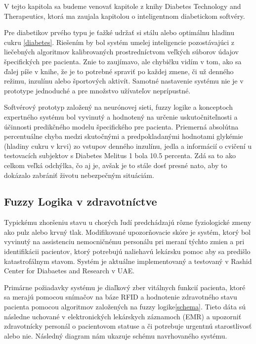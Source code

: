 V tejto kapitola sa budeme venovať kapitole z knihy Diabetes Technology and Therapeutics\cite{2000}, ktorá ma zaujala kapitolou o inteligentnom diabetickom softvéry.

Pre diabetikov prvého typu je ťažké udržať si stálu alebo optimálnu hladinu cukru \ref{diabetes}. Riešením by bol systém umelej inteligencie pozostávajúci z liečebných algoritmov kalibrovaných prostredníctvom veľkých súborov údajov špecifických pre pacienta.\cite{2000} Znie to zaujímavo, ale chybičku vidím v tom, ako sa ďalej píše v knihe, že je to potrebné spraviť po každej zmene, či už denného režimu, inzulínu alebo športových aktivít. Samotné nastavenie systému nie je v prototype jednoduché a pre množstvo užívateľov neprípustné. 

Softvérový prototyp založený na neurónovej sieti, fuzzy logike a konceptoch expertného systému bol vyvinutý a hodnotený na určenie uskutočniteľnosti a účinnosti predikčného modelu špecifického pre pacienta. Priemerná absolútna percentuálne chyba medzi skutočnými a predpokladanými hodnotami glykémie (hladiny cukru v krvi) zo vstupov denného inzulínu, jedla a informácií o cvičení u testovacích subjektov s Diabetes Melitus 1 bola 10.5 percenta.\cite{2000}
Zdá sa to ako celkom veľká odchýlka, čo aj je, avšak je to stále dosť presné nato, aby to dokázalo zabrániť životu nebezpečným situáciám. 

\subsection{Fuzzy Logika v zdravotníctve}

Typickému zhoršeniu stavu u chorých ľudí predchádzajú rôzne fyziologické zmeny ako pulz alebo krvný tlak. Modifikované upozorňovacie skóre je systém, ktorý bol vyvinutý na assistenciu nemocničnému personálu pri meraní týchto zmien a pri identifikácii pacientov, ktorý potrebujú naliehavú lekársku pomoc aby sa predišlo katastrofálnym stavom. \cite{2019} Systém je aktuálne implementovaný a testovaný v Rashid Center for Diabaetes and Research v UAE.

Primárne požiadavky systému je diaľkový zber vitálnych funkcií pacienta, ktoré sa merajú pomocou snímačov na báze RFID a hodnotenie zdravotného stavu pacienta pomocou algoritmov založených na fuzzy logike\ref{schema}.  Tieto dáta sú následne uchované v elektronických lekárskych záznamoch (EMR) a upozorniť zdravotnícky personál o pacientovom statuse a či potrebuje urgentnú starostlivosť alebo nie. \cite{2019} Následný diagram nám ukazuje schému navrhovaného systému.

